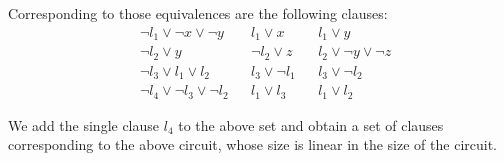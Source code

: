 \documentclass[11pt,a4paper]{uebung}
\begin{document}
\begin{enumerate}
{  Corresponding to those equivalences are the following clauses:
  \begin{align*}
    &\neg l_1 \lor \neg x \lor \neg y&& l_1 \lor x && l_1 \lor y\\
    &\neg l_2 \lor y && \neg l_2 \lor z&& l_2 \lor \neg y \lor \neg z\\
    &\neg l_3 \lor l_1 \lor l_2 && l_3 \lor \neg l_1 && l_3 \lor \neg l_2\\
    &\neg l_4 \lor \neg l_3 \lor \neg l_2 && l_1 \lor l_3 && l_1 \lor l_2
  \end{align*}

  We add the single clause $l_4$ to the above set and obtain a set of clauses
  corresponding to the above circuit, whose size is linear in the size of the
  circuit.
}

\end{enumerate}


\newpage

\end{document}
